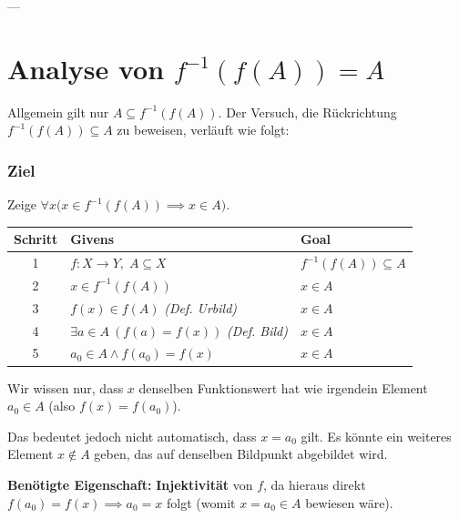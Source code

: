 \documentclass[11pt,a4paper]{article}
\begin{document}
---

\section{Analyse von $f^{-1}(f(A)) = A$}

Allgemein gilt nur $A \subseteq f^{-1}(f(A))$. Der Versuch, die Rückrichtung $f^{-1}(f(A)) \subseteq A$ zu beweisen, verläuft wie folgt:

\subsubsection*{Ziel}
Zeige $\forall x \bigl(x \in f^{-1}(f(A)) \implies x \in A\bigr)$.

\begin{vellemantable}
\centering
\begin{tabular}{cll}
\textbf{Schritt} & \textbf{Givens} & \textbf{Goal} \\ \hline
1 & $f: X \to Y, \; A \subseteq X$ & $f^{-1}(f(A)) \subseteq A$ \\
2 & $x \in f^{-1}(f(A))$ & $x \in A$ \\
3 & $f(x) \in f(A)$ \quad \textit{(Def. Urbild)} & $x \in A$ \\
4 & $\exists a \in A \: (f(a) = f(x))$ \quad \textit{(Def. Bild)} & $x \in A$ \\
5 & $a_0 \in A \land f(a_0) = f(x)$ & $x \in A$ \\
\end{tabular}
\end{vellemantable}

\begin{stuckbox}
Wir wissen nur, dass $x$ denselben Funktionswert hat wie irgendein Element $a_0 \in A$ (also $f(x) = f(a_0)$).

Das bedeutet jedoch nicht automatisch, dass $x = a_0$ gilt. Es könnte ein weiteres Element $x \notin A$ geben, das auf denselben Bildpunkt abgebildet wird.

\medskip
\textbf{Benötigte Eigenschaft:} \textbf{Injektivität} von $f$, da hieraus direkt $f(a_0) = f(x) \implies a_0 = x$ folgt (womit $x = a_0 \in A$ bewiesen wäre).
\end{stuckbox}
\end{document}
